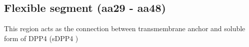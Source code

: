 \subsection{Flexible segment (aa29 - aa48)}

This region acts as the connection between transmembrane anchor and soluble form of DPP4 (sDPP4 ) 
